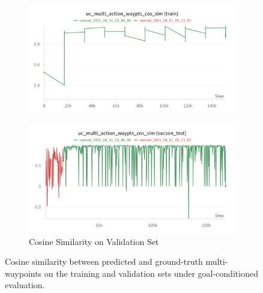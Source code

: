 \documentclass[12pt]{article}
\begin{document}
\begin{figure}[H]
    \centering
    \begin{subfigure}[b]{0.48\textwidth}
        \centering
        \includegraphics[width=\textwidth]{images/cs_multi_action_cos_train.png}
        \label{fig:uc_multi_action_waypts_cos_sim}
    \end{subfigure}
    \hfill
    \begin{subfigure}[b]{0.48\textwidth}
        \centering
        \includegraphics[width=\textwidth]{images/uc_multi_action_sim_test.png}
        \caption{Cosine Similarity on Validation Set}
        \label{fig:uc_action_multi_waypts_cos_sim_test}
    \end{subfigure}
    \caption{Cosine similarity between predicted and ground-truth multi-waypoints on the training and validation sets under goal-conditioned evaluation.}
\end{figure}
\end{document}
